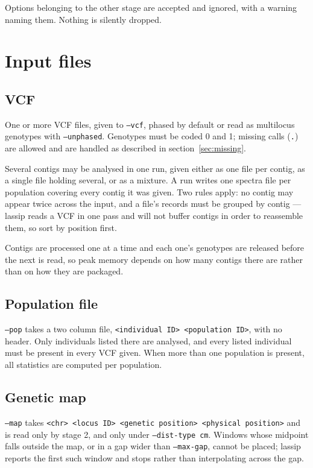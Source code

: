 \documentclass[11pt]{article}
\newcommand{\opt}[1]{\texttt{#1}}
\begin{document}
Options belonging to the other stage are accepted and ignored, with a warning
naming them. Nothing is silently dropped.

\section{Input files}

\subsection{VCF}

One or more VCF files, given to \opt{--vcf}, phased by default or read as
multilocus genotypes with \opt{--unphased}. Genotypes must be coded 0 and 1;
missing calls (\texttt{.}) are allowed and are handled as described in
section~\ref{sec:missing}.

Several contigs may be analysed in one run, given either as one file per
contig, as a single file holding several, or as a mixture. A run writes one
spectra file per population covering every contig it was given. Two rules
apply: no contig may appear twice across the input, and a file's records must
be grouped by contig --- lassip reads a VCF in one pass and will not buffer
contigs in order to reassemble them, so sort by position first.

Contigs are processed one at a time and each one's genotypes are released
before the next is read, so peak memory depends on how many contigs there are
rather than on how they are packaged.

\subsection{Population file}

\opt{--pop} takes a two column file, \texttt{<individual ID> <population ID>},
with no header. Only individuals listed there are analysed, and every listed
individual must be present in every VCF given. When more than one population is
present, all statistics are computed per population.

\subsection{Genetic map}

\opt{--map} takes \texttt{<chr> <locus ID> <genetic position> <physical
position>} and is read only by stage 2, and only under \opt{--dist-type cm}.
Windows whose midpoint falls outside the map, or in a gap wider than
\opt{--max-gap}, cannot be placed; lassip reports the first such window and
stops rather than interpolating across the gap.
\end{document}
